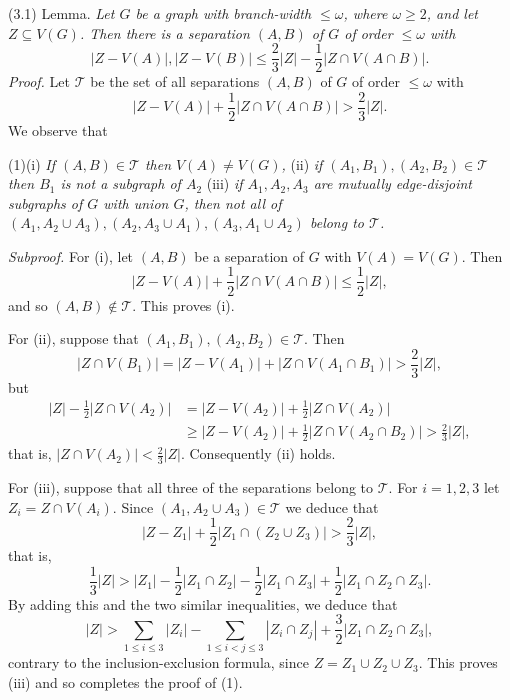 \stmt
(3.1) Lemma. \textit{Let $G$ be a graph with branch-width $\le \omega$, where $\omega \ge 2$, and let $Z \subseteq V(G)$. Then there is a separation $(A, B)$ of $G$ of order $\le \omega$ with}
\begin{equation*}
|Z - V(A)|, |Z - V(B)| \le \frac{2}{3} |Z| - \frac{1}{2} |Z \cap V(A \cap B)|.
\end{equation*}
\textit{Proof.} Let $\mathscr{T}$ be the set of all separations $(A, B)$ of $G$ of order $\le \omega$ with
\begin{equation*}
|Z - V(A)| + \frac{1}{2} |Z \cap V(A \cap B)| > \frac{2}{3} |Z|.
\end{equation*}
We observe that

(1)(i) \textit{If $(A, B) \in \mathscr{T}$ then $V(A) \ne V(G)$,} (ii) \textit{if $(A_1, B_1), (A_2, B_2) \in \mathscr{T}$ then $B_1$ is not a subgraph of $A_2$} (iii) \textit{if $A_1, A_2, A_3$ are mutually edge-disjoint subgraphs of $G$ with union $G$, then not all of $(A_1, A_2 \cup A_3), (A_2, A_3 \cup A_1), (A_3, A_1 \cup A_2)$ belong to $\mathscr{T}$.}

\textit{Subproof.} For (i), let $(A, B)$ be a separation of $G$ with $V(A) = V(G)$. Then
\begin{equation*}
|Z - V(A)| + \frac{1}{2} |Z \cap V(A \cap B)| \le \frac{1}{2} |Z|,
\end{equation*}
and so $(A, B) \notin \mathscr{T}$. This proves (i).

For (ii), suppose that $(A_1, B_1), (A_2, B_2) \in \mathscr{T}$. Then
\begin{equation*}
|Z \cap V(B_1)| = |Z - V(A_1)| + |Z \cap V(A_1 \cap B_1)| > \frac{2}{3} |Z|,
\end{equation*}
but
\begin{align*}
|Z| - \frac{1}{2} |Z \cap V(A_2)| &= |Z - V(A_2)| + \frac{1}{2} |Z \cap V(A_2)| \\
&\ge |Z - V(A_2)| + \frac{1}{2} |Z \cap V(A_2 \cap B_2)| > \frac{2}{3} |Z|,
\end{align*}
that is, $|Z \cap V(A_2)| < \frac{2}{3} |Z|$. Consequently (ii) holds.

For (iii), suppose that all three of the separations belong to $\mathscr{T}$. For $i = 1, 2, 3$ let $Z_i = Z \cap V(A_i)$. Since $(A_1, A_2 \cup A_3) \in \mathscr{T}$ we deduce that
\begin{equation*}
|Z - Z_1| + \frac{1}{2} |Z_1 \cap (Z_2 \cup Z_3)| > \frac{2}{3} |Z|,
\end{equation*}
that is,
\begin{equation*}
\frac{1}{3} |Z| > |Z_1| - \frac{1}{2} |Z_1 \cap Z_2| - \frac{1}{2} |Z_1 \cap Z_3| + \frac{1}{2} |Z_1 \cap Z_2 \cap Z_3|.
\end{equation*}
By adding this and the two similar inequalities, we deduce that
\begin{equation*}
|Z| > \sum_{1 \le i \le 3} |Z_i| - \sum_{1 \le i < j \le 3} |Z_i \cap Z_j| + \frac{3}{2} |Z_1 \cap Z_2 \cap Z_3|,
\end{equation*}
contrary to the inclusion-exclusion formula, since $Z = Z_1 \cup Z_2 \cup Z_3$. This proves (iii) and so completes the proof of (1).
